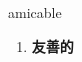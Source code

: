 
\begin{frame}
{\huge amicable}
\begin{center}
\begin{enumerate}\Large
  \item \textbf{友善的}
\end{enumerate}
\end{center}
\end{frame}
